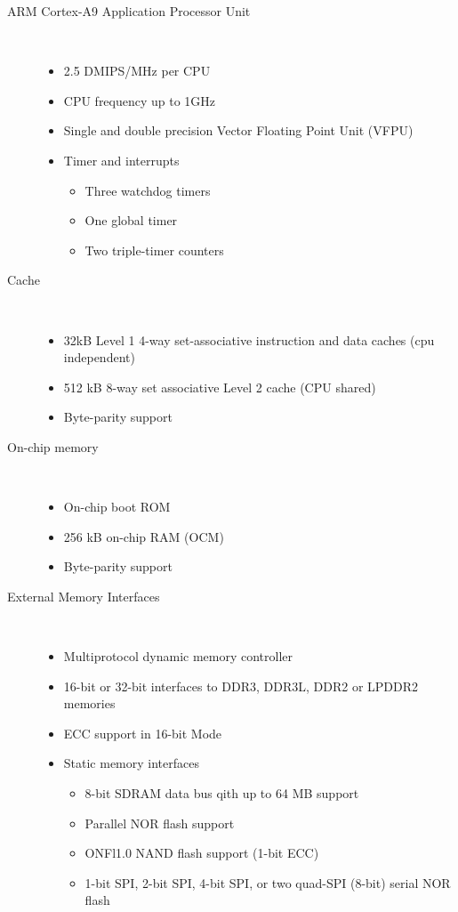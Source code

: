 \begin{description}
	\item[ARM Cortex-A9 Application Processor Unit] \hfill \\
	\begin{itemize}
		\item 2.5 DMIPS/MHz per CPU
		\item CPU frequency up to 1GHz
		\item Single and double precision Vector Floating Point Unit (VFPU)
		\item Timer and interrupts
		\begin{itemize}
			\item Three watchdog timers
			\item One global timer
			\item Two triple-timer counters
		\end{itemize}
	\end{itemize}

	\item[Cache] \hfill \\
	\begin{itemize}
		\item 32kB Level 1 4-way set-associative instruction and data caches (cpu independent)
		\item 512 kB 8-way set associative Level 2 cache (CPU shared)
		\item Byte-parity support
	\end{itemize}

	\item[On-chip memory] \hfill \\
	\begin{itemize}
		\item On-chip boot ROM
		\item 256 kB on-chip RAM (OCM)
		\item Byte-parity support
	\end{itemize}

	\item[External Memory Interfaces] \hfill \\
	\begin{itemize}
		\item Multiprotocol dynamic memory controller
		\item 16-bit or 32-bit interfaces to DDR3, DDR3L, DDR2 or LPDDR2 memories
		\item ECC support in 16-bit Mode
		\item Static memory interfaces
		\begin{itemize}
			\item 8-bit SDRAM data bus qith up to 64 MB support
			\item Parallel NOR flash support
			\item ONFl1.0 NAND flash support (1-bit ECC)
			\item 1-bit SPI, 2-bit SPI, 4-bit SPI, or two quad-SPI (8-bit) serial NOR flash
		\end{itemize}
	\end{itemize}


\end{description}
